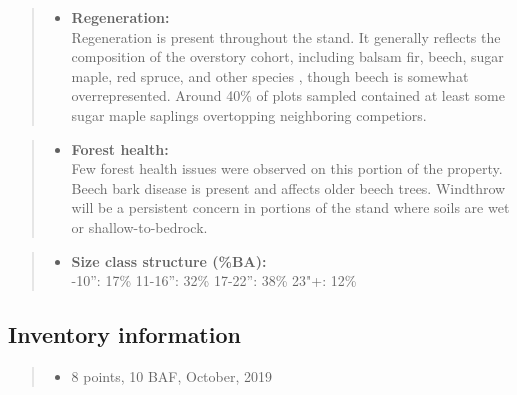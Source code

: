 \documentclass[]{tufte-handout}
\providecommand{\tightlist}{%
  \setlength{\itemsep}{0pt}\setlength{\parskip}{0pt}}
\begin{document}
\begin{quote}
\begin{itemize}
\tightlist
\item
  \textbf{Regeneration:}\\
  \vspace{2pt} Regeneration is present throughout the stand. It
  generally reflects the composition of the overstory cohort, including
  balsam fir, beech, sugar maple, red spruce, and other species , though
  beech is somewhat overrepresented. Around 40\% of plots sampled
  contained at least some sugar maple saplings overtopping neighboring
  competiors.
\end{itemize}
\end{quote}

\begin{quote}
\begin{itemize}
\tightlist
\item
  \textbf{Forest health:}\\
  \vspace{2pt} Few forest health issues were observed on this portion of
  the property. Beech bark disease is present and affects older beech
  trees. Windthrow will be a persistent concern in portions of the stand
  where soils are wet or shallow-to-bedrock.
\end{itemize}
\end{quote}

\begin{quote}
\begin{itemize}
\tightlist
\item
  \textbf{Size class structure (\%BA):}\\
  \vspace{2pt} -10'': 17\% \textbar{} 11-16'': 32\% \textbar{}
  17-22'': 38\% \textbar{} 23"+: 12\%
\end{itemize}
\end{quote}

\subsection{Inventory information}\label{inventory-information}

\begin{quote}
\begin{itemize}
\tightlist
\item
  8 points, 10 BAF, October, 2019
\end{itemize}
\end{quote}
\end{document}
